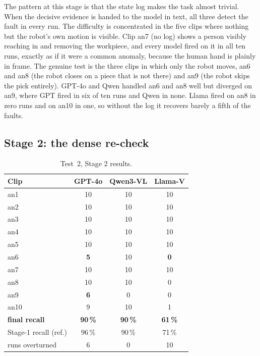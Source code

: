 \documentclass[11pt,a4paper]{article}
\begin{document}
The pattern at this stage is that the state log makes the task almost
trivial. When the decisive evidence is handed to the model in text, all
three detect the fault in every run. The difficulty is concentrated in the
five clips where nothing but the robot's own motion is visible. Clip an7
(no log) shows a person visibly reaching in and removing the workpiece,
and every model fired on it in all ten runs, exactly as if it were a
common anomaly, because the human hand is plainly in frame. The genuine
test is the three clips in which only the robot moves, an6 and an8 (the
robot closes on a piece that is not there) and an9 (the robot skips the
pick entirely). GPT-4o and Qwen handled an6 and an8 well but diverged on
an9, where GPT fired in six of ten runs and Qwen in none. Llama fired on
an8 in zero runs and on an10 in one, so without the log it recovers barely
a fifth of the faults.

\subsection{Stage 2: the dense re-check}

\begin{table}[h]
\centering
\small
\setlength{\tabcolsep}{7pt}
\begin{tabular}{@{}l ccc@{}}
\toprule
Clip & GPT-4o & Qwen3-VL & Llama-V \\
\midrule
an1  & 10 & 10 & 10 \\
an2  & 10 & 10 & 10 \\
an3  & 10 & 10 & 10 \\
an4  & 10 & 10 & 10 \\
an5  & 10 & 10 & 10 \\
an6  & \textbf{5} & 10 & \textbf{0} \\
an7  & 10 & 10 & 10 \\
an8  & 10 & 10 & 0 \\
an9  & \textbf{6} & 0 & 0 \\
an10 & 9 & 10 & 1 \\
\midrule
\textbf{final recall} & \textbf{90\,\%} & \textbf{90\,\%} & \textbf{61\,\%} \\
\midrule
Stage-1 recall (ref.) & 96\,\% & 90\,\% & 71\,\% \\
runs overturned & 6 & 0 & 10 \\
\bottomrule
\end{tabular}
\caption{Test~2, Stage 2 results.}
\label{tab:test2-stage2}
\end{table}
\FloatBarrier
\end{document}
